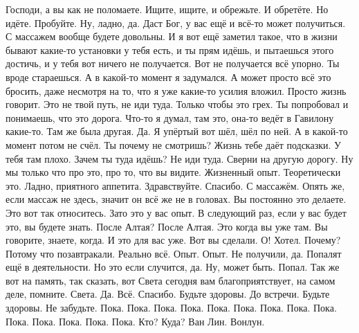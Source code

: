 Господи, а вы как не поломаете.
Ищите, ищите, и обрежьте.
И обретёте.
Но идёте.
Пробуйте.
Ну, ладно, да.
Даст Бог, у вас ещё и всё-то может получиться.
С массажем вообще будете довольны.
И я вот ещё заметил такое, что в жизни бывают какие-то установки у тебя есть, и ты прям идёшь, и пытаешься этого достичь, и у тебя вот ничего не получается.
Вот не получается всё упорно.
Ты вроде стараешься.
А в какой-то момент я задумался.
А может просто всё это бросить, даже несмотря на то, что я уже какие-то усилия вложил.
Просто жизнь говорит.
Это не твой путь, не иди туда.
Только чтобы это грех.
Ты попробовал и понимаешь, что это дорога.
Что-то я думал, там это, она-то ведёт в Гавилону какие-то.
Там же была другая.
Да.
Я упёртый вот шёл, шёл по ней.
А в какой-то момент потом не счёл.
Ты почему не смотришь?
Жизнь тебе даёт подсказки.
У тебя там плохо.
Зачем ты туда идёшь?
Не иди туда.
Сверни на другую дорогу.
Ну мы только что про это, про то, что вы видите.
Жизненный опыт.
Теоретически это.
Ладно, приятного аппетита.
Здравствуйте.
Спасибо.
С массажём.
Опять же, если массаж не здесь, значит он всё же не в головах.
Вы постоянно это делаете.
Это вот так относитесь.
Зато это у вас опыт.
В следующий раз, если у вас будет это, вы будете знать.
После Алтая?
После Алтая.
Это когда вы уже там.
Вы говорите, знаете, когда.
И это для вас уже.
Вот вы сделали.
О!
Хотел.
Почему?
Потому что позавтракали.
Реально всё.
Опыт.
Опыт.
Не получили, да.
Попалят ещё в деятельности.
Но это если случится, да.
Ну, может быть.
Попал.
Так же вот на память, так сказать, вот Света сегодня
вам благоприятствует, на самом деле, помните.
Света.
Да.
Всё.
Спасибо.
\bye
Будьте здоровы.
До встречи.
Будьте здоровы.
Не забудьте.
Пока.
Пока.
Пока.
Пока.
Пока.
Пока.
Пока.
Пока.
Пока.
Пока.
Пока.
Пока.
Пока.
Пока.
Кто?
Куда?
Ван Лин.
Вонлун.
